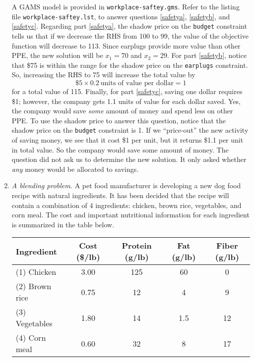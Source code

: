 \begin{enumerate}
\begin{solution}
A GAMS model is provided in \texttt{workplace-saftey.gms}. Refer to
the listing file \texttt{workplace-saftey.lst}, to answer questions
\ref{safetya}, \ref{safetyb}, and \ref{safetyc}.  Regarding part
\ref{safetya}, the shadow price on the \texttt{budget} constraint
tells us that if we decrease the RHS from 100 to 99, the value of the
objective function will decrease to 113. Since earplugs provide more
value than other PPE, the new solution will be $x_1=70$ and $x_2=29$.
For part \ref{safetyb}, notice that \$75 is within the range for the
shadow price on the \texttt{earplugs} constraint. So, increasing the
RHS to 75 will increase the total value by
\[ \$5 \times 0.2~\text{units of value per dollar} = 1 \]
for a total value of 115.
Finally, for part \ref{safetyc}, saving one dollar requires \$1; however, the
company gets 1.1 units of value for each dollar saved. Yes, the
company would save \emph{some} amount of money and spend less on other
PPE. To use the shadow price to answer this question, notice that the
shadow price on the \texttt{budget} constraint is 1. If we
``price-out'' the new activity of saving money, we see that it cost
\$1 per unit, but it returns \$1.1 per unit in total value. So the
company would save some amount of money. The question did not ask us
to determine the new solution. It only asked whether \emph{any} money
would be allocated to savings.
\end{solution}

\item \emph{A blending problem.}  A pet food manufacturer is
  developing a new dog food recipe with natural ingredients. It has
  been decided that the recipe will contain a combination of 4
  ingredients: chicken, brown rice, vegetables, and corn meal. The
  cost and important nutritional information for each ingredient is
  summarized in the table below.

\begin{center}
\begin{tabular}{lcccc} \\
Ingredient  &   Cost (\$/lb)  & Protein (g/lb)  &  Fat (g/lb) &  Fiber (g/lb)  \\ \hline
(1) Chicken   &  3.00 & 125 & 60 & 0 \\
(2) Brown rice   &  0.75 & 12 & 4 & 9 \\
(3) Vegetables   &  1.80 & 14 & 1.5 & 12 \\
(4) Corn meal& 0.60 & 32 & 8 & 17
\end{tabular}
\end{center}


\end{enumerate}
